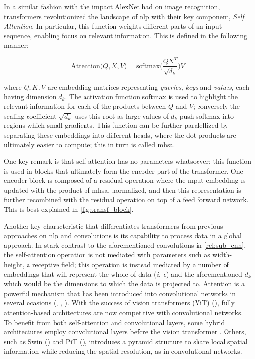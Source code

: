 In a similar fashion with the impact AlexNet had on image recognition, transformers revolutionized 
the landscape of \gls{nlp} with their key component, \emph{Self Attention}. In particular, this 
function weights different parts of an input sequence, enabling focus on relevant information. 
This is defined in the following manner:

\begin{equation}
    \mbox{Attention(}Q, K, V) = \mbox{softmax(}\frac{QK^T}{\sqrt{d_k}})V
    \label{eq:att}
\end{equation}

where $Q, K, V$ are embedding matrices representing \emph{queries}, \emph{keys} and \emph{values}, 
each having dimension $d_k$. The activation function softmax is used to highlight the relevant 
information for each of the products between $Q$ and $V$; conversely the scaling coefficient 
$\sqrt{d_k}$ uses this root as large values of $d_k$ push softmax into regions which small 
gradients. This function can be further paralellized by separating these embeddings into different 
heads, where the dot products are ultimately easier to compute; this in turn is called \gls{mhsa}.

One key remark is that self attention has no parameters whatsoever; this function is used in 
blocks that ultimately form the encoder part of the transformer. One encoder block is composed of a 
residual  operation where the input embedding is updated with the product of \gls{mhsa}, normalized, 
and then this representation is further recombined with the residual operation on top of a feed 
forward network. This is best explained in \autoref{fig:transf_block}.



Another key characteristic that differentiates transformers from previous approaches on \gls{nlp} 
and convolutions is its capability to process data in a global approach. In stark contrast to the 
aforementioned convolutions in \autoref{rel:sub_cnn}, the self-attention operation is not mediated 
with parameters such as width-height, a receptive field; this operation is instead mediated by a 
number of embeddings that will represent the whole of data (\textit{i}. \textit{e}) and the 
aforementioned $d_k$ which would be the dimensions to which the data is projected to. 
Attention is a powerful mechanism that has been introduced into convolutional networks in several 
ocasions (\cite{bello2019attention}, \cite{ramachandran2019stand}, \cite{shen2020global}). 
With the success of vision transformers (ViT) (\cite{dosovitskiy2020image}), fully attention-based 
architectures are now competitive with convolutional networks. To benefit from both self-attention 
and convolutional layers, some hybrid architectures employ convolutional layers before the vision transformer 
. Others, such as Swin (\cite{liu2021swin}) and PiT 
(\cite{heo2021rethinking}), introduces a pyramid structure to share local spatial information 
while reducing the spatial resolution, as in convolutional networks. 

